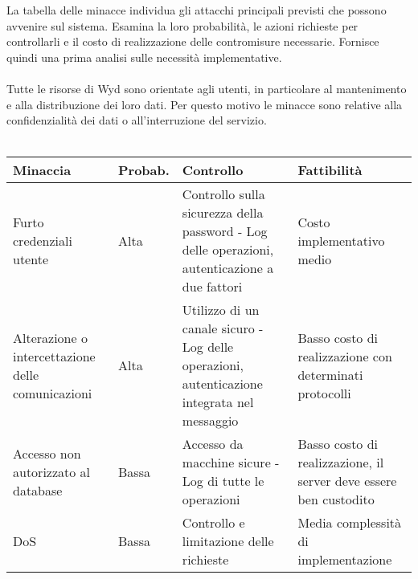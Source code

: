 La tabella delle minacce individua gli attacchi principali previsti che possono avvenire sul sistema.
Esamina la loro probabilità, le azioni richieste per controllarli e il costo di realizzazione delle contromisure necessarie.
Fornisce quindi una prima analisi sulle necessità implementative.\\
\\
Tutte le risorse di Wyd sono orientate agli utenti, 
in particolare al mantenimento e alla distribuzione dei loro dati.
Per questo motivo le minacce sono relative alla confidenzialità dei dati o
all'interruzione del servizio.\\
\\
\begin{longtable}{|P{3.3cm}|P{1.6cm}|P{6.2cm}|P{4cm}|}
        \hline
        \textbf{Minaccia}                                 & \textbf{Probab.} & \textbf{Controllo}                                                                                                                                                                                                                      & \textbf{Fattibilità}                                              \\
        \hline
        \endhead
        Furto credenziali utente                          & Alta             & Controllo sulla sicurezza della password - Log delle operazioni, autenticazione a due fattori                                                                                                                                           & Costo implementativo medio                                        \\
        \hline
        Alterazione o intercettazione delle comunicazioni & Alta             & Utilizzo di un canale sicuro - Log delle operazioni, autenticazione integrata nel messaggio                                                                                                                                             & Basso costo di realizzazione con determinati protocolli           \\
        \hline
        Accesso non autorizzato al database               & Bassa            & Accesso da macchine sicure - Log di tutte le operazioni                                                                                                                                                                                 & Basso costo di realizzazione, il server deve essere ben custodito \\
        \hline
        DoS                                               & Bassa            & Controllo e limitazione delle richieste                                                                                                                                                                                                 & Media complessità di implementazione                              \\

\end{longtable}
